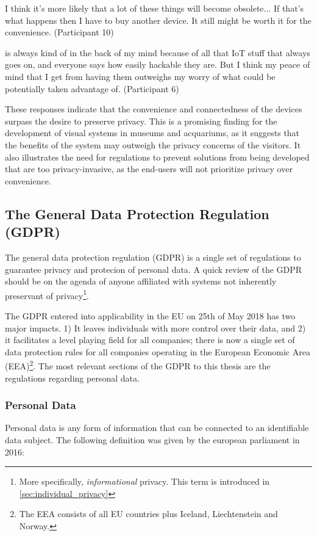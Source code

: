 \begin{myquote}
    I think it's more likely that a lot of these things will become obsolete... If that's what happens then I have to buy another device. It still might be worth it for the convenience. (Participant 10)
\end{myquote}

\begin{myquote}
     is always kind of in the back of my mind because of all that IoT stuff that always goes on, and everyone says how easily hackable they are. But I think my peace of mind that I get from having them outweighs my worry of what could be potentially taken advantage of. (Participant 6)
\end{myquote}

These responses indicate that the convenience and connectedness of the devices surpass the desire to preserve privacy. This is a promising finding for the development of visual systems in museums and acquariums, as it suggests that the benefits of the system may outweigh the privacy concerns of the visitors. It also illustrates the need for regulations to prevent solutions from being developed that are too privacy-invasive, as the end-users will not prioritize privacy over convenience.

\subsection{The General Data Protection Regulation (GDPR)}
\label{sec:GDPR}
The general data protection regulation (GDPR) is a single set of regulations to guarantee privacy and protecion of personal data. A quick review of the GDPR should be on the agenda of anyone affiliated with systems not inherently preservant of privacy\footnote{More specifically, \textit{informational} privacy. This term is introduced in \ref{sec:individual_privacy}}.

The GDPR entered into applicability in the EU on 25th of May 2018 has two major impacts. 1) It leaves individuals with more control over their data, and 2) it facilitates a level playing field for all companies; there is now a single set of data protection rules for all companies operating in the European Economic Area (EEA)\footnote{The EEA consists of all EU countries plus Iceland, Liechtenstein and Norway.}. The most relevant sections of the GDPR to this thesis are the regulations regarding personal data.

\subsubsection{Personal Data}
\label{sec:personal_data}
Personal data is any form of information that can be connected to an identifiable data subject. The following definition was given by the european parliament in 2016:

